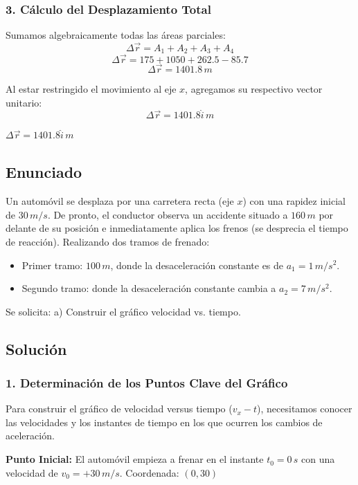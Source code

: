 \documentclass[12pt, a4paper]{article}
\begin{document}
\subsubsection*{3. Cálculo del Desplazamiento Total}
Sumamos algebraicamente todas las áreas parciales:
$$ \Delta\vec{r} = A_1 + A_2 + A_3 + A_4 $$
$$ \Delta\vec{r} = 175 + 1050 + 262.5 - 85.7 $$
$$ \Delta\vec{r} = 1401.8 \, \si{m} $$

Al estar restringido el movimiento al eje $x$, agregamos su respectivo vector unitario:
$$ \Delta\vec{r} = 1401.8\hat{i} \, \si{m} $$

\begin{tcolorbox}[colback=green!5!white, colframe=green!50!black, title=Respuesta Final]
\centering \Large $\Delta\vec{r} = 1401.8\hat{i} \, \si{m}$
\end{tcolorbox}

\newpage

\subsection*{Enunciado}
Un automóvil se desplaza por una carretera recta (eje $x$) con una rapidez inicial de $30 \, \si{m/s}$. De pronto, el conductor observa un accidente situado a $160 \, \si{m}$ por delante de su posición e inmediatamente aplica los frenos (se desprecia el tiempo de reacción). Realizando dos tramos de frenado:
\begin{itemize}
    \item Primer tramo: $100 \, \si{m}$, donde la desaceleración constante es de $a_1 = 1 \, \si{m/s^2}$.
    \item Segundo tramo: donde la desaceleración constante cambia a $a_2 = 7 \, \si{m/s^2}$.
\end{itemize}
Se solicita:
a) Construir el gráfico velocidad vs. tiempo.

\subsection*{Solución}

\subsubsection*{1. Determinación de los Puntos Clave del Gráfico}
Para construir el gráfico de velocidad versus tiempo ($v_x - t$), necesitamos conocer las velocidades y los instantes de tiempo en los que ocurren los cambios de aceleración.

\textbf{Punto Inicial:}
El automóvil empieza a frenar en el instante $t_0 = 0 \, \si{s}$ con una velocidad de $v_0 = +30 \, \si{m/s}$.
Coordenada: $(0, 30)$
\end{document}
